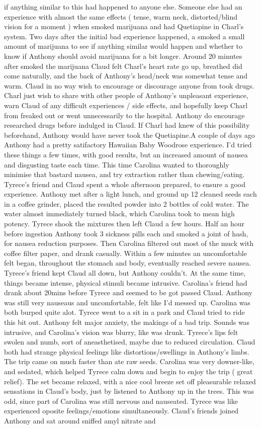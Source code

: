 \documentclass[12pt]{book}
\begin{document}
if anything similar to this had happened to anyone else. Someone else had an experience with almost the same effects ( tense, warm neck, distorted/blind vision for a moment ) when smoked marijuana and had Quetiapine in Charl's system. Two days after the initial bad experience happened, a smoked a small amount of marijuana to see if anything similar would happen and whether to know if Anthony should avoid marijuana for a bit longer. Around 20 minutes after smoked the marijuana Claud felt Charl's heart rate go up, breathed did come naturally, and the back of Anthony's head/neck was somewhat tense and warm. Claud in no way wish to encourage or discourage anyone from took drugs. Charl just wish to share with other people of Anthony's unpleasant experience, warn Claud of any difficult experiences / side effects, and hopefully keep Charl from freaked out or went unnecessarily to the hospital. Anthony do encourage researched drugs before indulged in Claud. If Charl had knew of this possibility beforehand, Anthony would have never took the Quetiapine.A couple of days ago Anthony had a pretty satifactory Hawaiian Baby Woodrose experience. I'd tried these things a few times, with good results, but an increased amount of nausea and disgusting taste each time. This time Carolina wanted to thoroughly minimise that bastard nausea, and try extraction rather than chewing/eating. Tyrece's friend and Claud spent a whole afternoon prepared, to ensure a good experience. Anthony met after a light lunch, and ground up 12 cleaned seeds each in a coffee grinder, placed the resulted powder into 2 bottles of cold water. The water almost immediately turned black, which Carolina took to mean high potency. Tyrece shook the mixtures then left Claud a few hours. Half an hour before ingestion Anthony took 3 sickness pills each and smoked a joint of hash, for nausea reduction purposes. Then Carolina filtered out most of the muck with coffee filter paper, and drank casually. Within a few minutes an uncomfortable felt began, throughout the stomach and body, eventually reached severe nausea. Tyrece's friend kept Claud all down, but Anthony couldn't. At the same time, things became intense, physical stimuli became intrusive. Carolina's friend had drank about 20mins before Tyrece and seemed to be got passed Claud. Anthony was still very nauseaus and uncomfortable, felt like I'd messed up. Carolina was both burped quite alot. Tyrece went to a sit in a park and Claud tried to ride this bit out. Anthony felt major anxiety, the makings of a bad trip. Sounds was intrusive, and Carolina's vision was blurry, like was drunk. Tyrece's lips felt swolen and numb, sort of aneasthetised, maybe due to reduced circulation. Claud both had strange physical feelings like distortions/swellings in Anthony's limbs. The trip came on much faster than ate raw seeds. Carolina was very downer-like, and sedated, which helped Tyrece calm down and begin to enjoy the trip ( great relief). The set became relaxed, with a nice cool breeze set off pleasurable relaxed sensations in Claud's body, just by listened to Anthony up in the trees. This was odd, since part of Carolina was still nervous and nauseated. Tyrece was like experienced oposite feelings/emotions simultaneously. Claud's friends joined Anthony and sat around sniffed amyl nitrate and 
\end{document}
